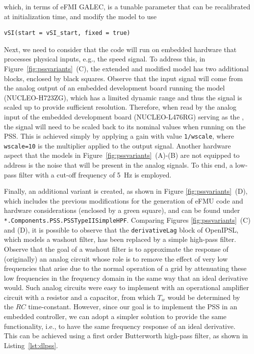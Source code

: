 \noindent{}which, in terms of eFMI GALEC, is a tunable parameter that can be recalibrated at initialization time, and modify the model to use

\begin{lstlisting}[language = modelica, numbers = none]
vSI(start = vSI_start, fixed = true)
\end{lstlisting}

\noindent{}Next, we need to consider that the code will run on embedded hardware that processes physical inputs, e.g., the speed signal. To address this, in Figure~\ref{fig:pssvariants}~(C), the extended and modified model has two additional blocks, enclosed by black squares. Observe that the input signal will come from the analog output of an embedded development board running the \plant{} model (NUCLEO-H723ZG), which has a limited dynamic range and thus the signal is scaled up to provide sufficient resolution. Therefore, when read by the analog input of the embedded development board (NUCLEO-L476RG) serving as the \controller{}, the signal will need to be scaled back to its nominal values when running on the PSS. This is achieved simply by applying a gain with value \texttt{1/wscale}, where \texttt{wscale=10} is the multiplier applied to the output signal. Another hardware aspect that the models in Figure~\ref{fig:pssvariants}~(A)-(B) are not equipped to address is the noise that will be present in the analog signals. To this end, a low-pass filter with a cut-off frequency of 5~Hz is employed.

Finally, an additional variant is created, as shown in Figure \ref{fig:pssvariants}~(D), which includes the previous modifications for the generation of eFMU code and hardware considerations (enclosed by a green square), and can be found under \texttt{*.Components.PSS.PSSTypeIISimpleHPF}. Comparing Figures \ref{fig:pssvariants}~(C) and (D), it is possible to observe that the \texttt{derivativeLag} block of OpenIPSL, which models a washout filter, has been replaced by a simple high-pass filter. Observe that the goal of a washout filter is to approximate the response of (originally) an analog circuit whose role is to remove the effect of very low frequencies that arise due to the normal operation of a grid by attenuating these low frequencies in the frequency domain in the same way that an ideal derivative would. Such analog circuits were easy to implement with an operational amplifier circuit with a resistor and a capacitor, from which $T_w$ would be determined by the $RC$ time-constant. However, since our goal is to implement the PSS in an embedded controller, we can adopt a simpler solution to provide the same functionality, i.e., to have the same frequency response of an ideal derivative. This can be achieved using a first order Butterworth high-pass filter, as shown in Listing~\ref{lst:dlpss}.

